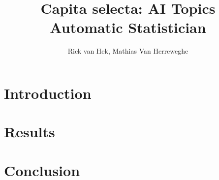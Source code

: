\documentclass[letterpaper, 10 pt, conference]{ieeeconf}
\title{\LARGE \textbf{
Capita selecta: AI Topics} \\ Automatic Statistician 
}
\author{Rick van Hek, Mathias Van Herreweghe
}
\begin{document}
\maketitle
\thispagestyle{empty}
\pagestyle{empty}


\begin{abstract}

\begin{comment} %
In this paper I demonstrate a novel design for an optoelectronic State Machine which replaces input/output forming logic found in conventional state machines with BDD based optical logic while still using solid state memory in the form of flip-flops in order to store states. This type of logic makes use of waveguides and ring resonators to create binary switches. These switches in turn can be used to create combinational logic which can be used as input/output forming logic\cite{Killick2012} for a state machine. Replacing conventional combinational logic with BDD based optical logic allows for a faster range of state machines that can certainly outperform conventional state machines as propagation delays within the logic described are in the order of picoseconds as opposed to nanoseconds in digital logic.
\end{comment}

\end{abstract}

\tableofcontents
\section{Introduction}
\lipsum[1-2]



\section{Results}
\section{Conclusion}
\lipsum[100-101]


\addtolength{\textheight}{-12cm}  



\end{document}
